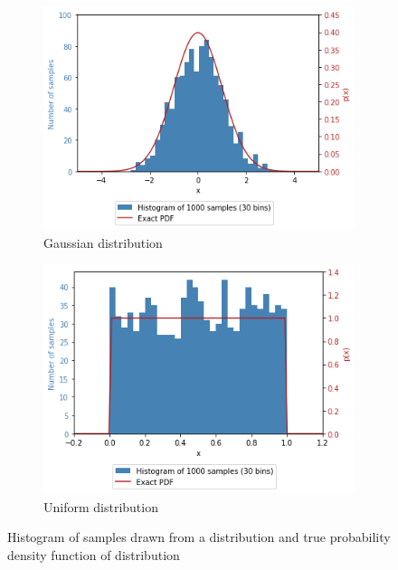 \documentclass[a4paper]{article}
\begin{document}
\begin{figure}
    \centering
    \begin{subfigure}[b]{0.45\textwidth}
        \centering
        \includegraphics[width=\textwidth]{figures/gaussian_histogram_and_pdf.png}
        \caption{Gaussian distribution}
        \label{fig:gaussian_histogram_and_pdf}
    \end{subfigure}
    \hfill
    \begin{subfigure}[b]{0.45\textwidth}
        \centering
        \includegraphics[width=\textwidth]{figures/uniform_histogram_and_pdf.png}
        \caption{Uniform distribution}
        \label{fig:uniform_histogram_and_pdf}
    \end{subfigure}
    \caption{Histogram of samples drawn from a distribution and true probability density function of distribution}
    \label{fig:histogram_and_pdf}
\end{figure}
\end{document}
